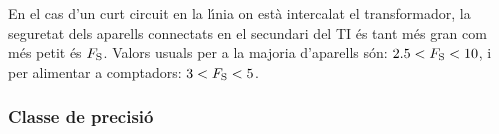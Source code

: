 En el cas d'un curt circuit en la l\'{\i}nia on est\`{a} intercalat el
transformador, la seguretat dels aparells connectats en el secundari
del TI \'{e}s tant m\'{e}s gran com m\'{e}s petit \'{e}s  $F_\mathrm{S}$. Valors usuals
per a la majoria d'aparells s\'{o}n:  $\num{2,5}<F_\mathrm{S}<10$, i per
alimentar a comptadors: $3<F_\mathrm{S}<5$.

\subsubsection{Classe de precisi\'{o}}

%
